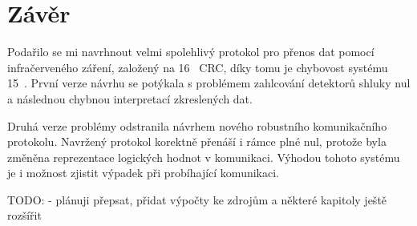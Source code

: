 \chapter{Závěr}

Podařilo se mi navrhnout velmi spolehlivý protokol pro přenos dat pomocí infračerveného záření, založený na 16~ CRC, díky tomu je chybovost systému 15~. První verze návrhu se potýkala s problémem zahlcování detektorů shluky nul a následnou chybnou interpretací zkreslených dat.

Druhá verze problémy odstranila návrhem nového robustního komunikačního protokolu. Navržený protokol korektně přenáší i rámce plné nul, protože byla změněna reprezentace logických hodnot v komunikaci. Výhodou tohoto systému je i možnost zjistit výpadek při probíhající komunikaci.

TODO: - plánuji přepsat, přidat výpočty ke zdrojům a některé kapitoly ještě rozšířit
